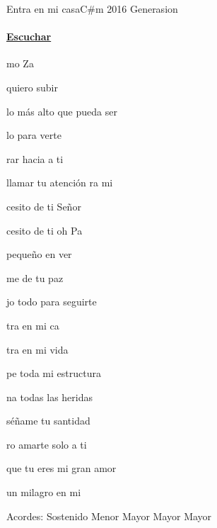 \documentclass[12pt, spanish]{book}
\newcommand{\NotCCLIed}{\relax}
\begin{document}
    \begin{song}{Entra en mi casa}{C\#m}
        {2016} %
        {Generasion}
        {} %
        {} %
        \ifChordBk
        \paragraph{\mbox{}\hfill\protect\href{https://open.spotify.com/intl-es/track/2BfjpgzJ2e0pwnfigcB2R2}{Escuchar}\mbox{}\hfill}
        \fi



        \begin{SBOpGroup}
            mo Za

             quiero subir

             lo más alto que pueda  ser

            lo para verte

            rar hacia a ti

             llamar tu atención ra mi

            cesito de ti Señor

            cesito de ti oh Pa

             pequeño en ver

            me de tu paz

            jo todo para seguirte
        \end{SBOpGroup}

        \begin{SBChorus}
            tra en mi ca

            tra en mi vida

            pe toda mi estructura

            na todas las heridas

            séñame tu santidad

            ro amarte solo a ti

            que tu eres mi gran amor

             un milagro en mi
        \end{SBChorus}

        \ifChordBk
        \begin{SBOpGroup}
            Acordes:
             Sostenido Menor \hfill
             Mayor \hfill\null\break
             Mayor \hfill
             Mayor \hfill\null\break
        \end{SBOpGroup}
        \fi
    \end{song}
\end{document}
